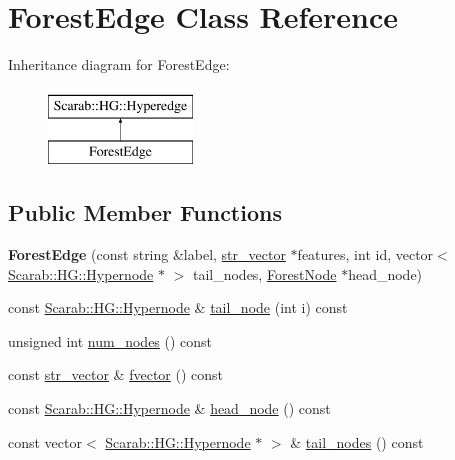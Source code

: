 \hypertarget{classForestEdge}{
\section{ForestEdge Class Reference}
\label{classForestEdge}
}
Inheritance diagram for ForestEdge:\begin{figure}[H]
\begin{center}
\leavevmode
\includegraphics[height=2cm]{classForestEdge}
\end{center}
\end{figure}
\subsection*{Public Member Functions}
\begin{DoxyCompactItemize}
\item 
\hypertarget{classForestEdge_ad12d0d44f6792688e2ca339ef5f1504e}{
{\bfseries ForestEdge} (const string \&label, \hyperlink{classsvector}{str\_\-vector} $\ast$features, int id, vector$<$ \hyperlink{classScarab_1_1HG_1_1Hypernode}{Scarab::HG::Hypernode} $\ast$ $>$ tail\_\-nodes, \hyperlink{classForestNode}{ForestNode} $\ast$head\_\-node)}
\label{classForestEdge_ad12d0d44f6792688e2ca339ef5f1504e}

\item 
const \hyperlink{classScarab_1_1HG_1_1Hypernode}{Scarab::HG::Hypernode} \& \hyperlink{classForestEdge_a20069b896bec6c5a83c24480c9057f4f}{tail\_\-node} (int i) const 
\item 
unsigned int \hyperlink{classForestEdge_a46d00caee9d1984712cae52f4a45be7a}{num\_\-nodes} () const 
\item 
const \hyperlink{classsvector}{str\_\-vector} \& \hyperlink{classForestEdge_a694457d52b715922cb0487d90ff3ab6c}{fvector} () const 
\item 
const \hyperlink{classScarab_1_1HG_1_1Hypernode}{Scarab::HG::Hypernode} \& \hyperlink{classForestEdge_a75fd8cd6604187f2e046a3bc0b0da349}{head\_\-node} () const 
\item 
const vector$<$ \hyperlink{classScarab_1_1HG_1_1Hypernode}{Scarab::HG::Hypernode} $\ast$ $>$ \& \hyperlink{classForestEdge_acb7544b472df09ef760c88afddeab5de}{tail\_\-nodes} () const 
\end{DoxyCompactItemize}
